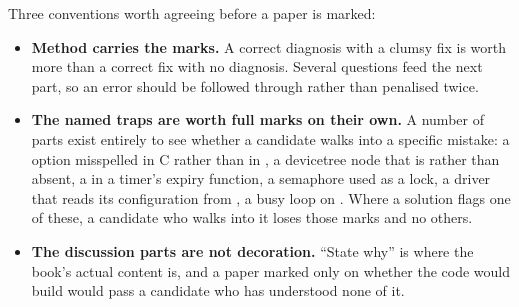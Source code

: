 Three conventions worth agreeing before a paper is marked:
\begin{itemize}
  \item \textbf{Method carries the marks.} A correct diagnosis with a clumsy fix is worth more than
    a correct fix with no diagnosis. Several questions feed the next part, so an error should be
    followed through rather than penalised twice.
  \item \textbf{The named traps are worth full marks on their own.} A number of parts exist entirely
    to see whether a candidate walks into a specific mistake: a  option misspelled in
    C rather than in , a devicetree node that is  rather than absent, a
     in a timer's expiry function, a semaphore used as a lock, a driver that reads
    its configuration from , a busy loop on . Where a solution flags
    one of these, a candidate who walks into it loses those marks and no others.
  \item \textbf{The discussion parts are not decoration.} ``State why'' is where the book's actual
    content is, and a paper marked only on whether the code would build would pass a candidate who
    has understood none of it.
\end{itemize}
